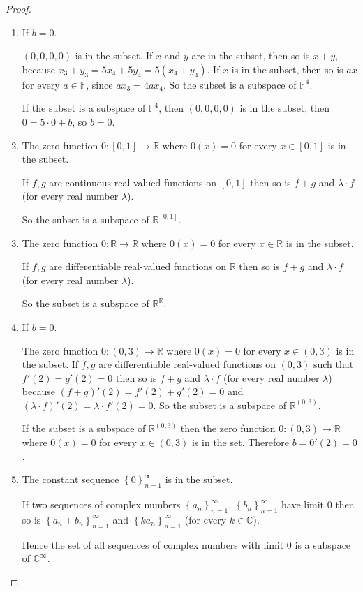 \begin{proof}
    \begin{enumerate}[label={(\alph*)}]
        \item If $b = 0$.

              $(0, 0, 0, 0)$ is in the subset. If $x$ and $y$ are in the subset, then so is $x + y$, because $x_{3} + y_{3} = 5x_{4} + 5y_{4} = 5(x_{4} + y_{4})$. If $x$ is in the subset, then so is $ax$ for every $a\in\mathbb{F}$, since $ax_{3} = 4ax_{4}$. So the subset is a subspace of $\mathbb{F}^{4}$.

              If the subset is a subspace of $\mathbb{F}^{4}$, then $(0, 0, 0, 0)$ is in the subset, then $0 = 5\cdot 0 + b$, so $b = 0$.
        \item The zero function $0: [0, 1]\to \mathbb{R}$ where $0(x) = 0$ for every $x\in [0, 1]$ is in the subset.

              If $f, g$ are continuous real-valued functions on $[0, 1]$ then so is $f + g$ and $\lambda\cdot f$ (for every real number $\lambda$).

              So the subset is a subspace of $\mathbb{R}^{[0,1]}$.
        \item The zero function $0: \mathbb{R}\to \mathbb{R}$ where $0(x) = 0$ for every $x\in \mathbb{R}$ is in the subset.

              If $f, g$ are differentiable real-valued functions on $\mathbb{R}$ then so is $f + g$ and $\lambda\cdot f$ (for every real number $\lambda$).

              So the subset is a subspace of $\mathbb{R}^{\mathbb{R}}$.
        \item If $b = 0$.

              The zero function $0: (0, 3)\to \mathbb{R}$ where $0(x) = 0$ for every $x\in (0, 3)$ is in the subset. If $f, g$ are differentiable real-valued functions on $(0, 3)$ such that $f'(2) = g'(2) = 0$ then so is $f + g$ and $\lambda\cdot f$ (for every real number $\lambda$) because $(f + g)'(2) = f'(2) + g'(2) = 0$ and $(\lambda\cdot f)'(2) = \lambda \cdot f'(2) = 0$. So the subset is a subspace of $\mathbb{R}^{(0, 3)}$.

              If the subset is a subspace of $\mathbb{R}^{(0, 3)}$ then the zero function $0: (0, 3)\to \mathbb{R}$ where $0(x) = 0$ for every $x\in (0, 3)$ is in the set. Therefore $b = 0'(2) = 0$.
        \item The constant sequence ${\left\{0\right\}}^{\infty}_{n=1}$ is in the subset.

              If two sequences of complex numbers ${\left\{a_{n}\right\}}^{\infty}_{n=1}$, ${\left\{b_{n}\right\}}^{\infty}_{n=1}$ have limit $0$ then so is  ${\left\{a_{n} + b_{n}\right\}}^{\infty}_{n=1}$ and  ${\left\{k a_{n}\right\}}^{\infty}_{n=1}$ (for every $k\in\mathbb{C}$).

              Hence the set of all sequences of complex numbers with limit $0$ is a subspace of $\mathbb{C}^{\infty}$.
    \end{enumerate}
\end{proof}

